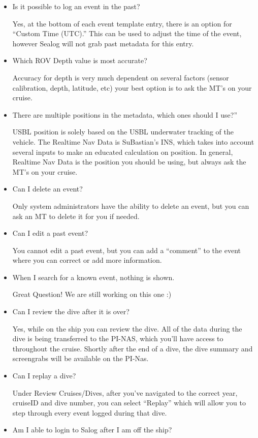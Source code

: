 \documentclass[
  letterpaper,
  DIV=11,
  numbers=noendperiod]{scrreprt}
\begin{document}
\begin{itemize}
\item
  Is it possible to log an event in the past?

  Yes, at the bottom of each event template entry, there is an option
  for ``Custom Time (UTC).'' This can be used to adjust the time of the
  event, however Sealog will not grab past metadata for this entry.
\item
  Which ROV Depth value is most accurate?

  Accuracy for depth is very much dependent on several factors (sensor
  calibration, depth, latitude, etc) your best option is to ask the MT's
  on your cruise.
\item
  There are multiple positions in the metadata, which ones should I
  use?''

  USBL position is solely based on the USBL underwater tracking of the
  vehicle. The Realtime Nav Data is SuBastian's INS, which takes into
  account several inputs to make an educated calculation on position. In
  general, Realtime Nav Data is the position you should be using, but
  always ask the MT's on your cruise.
\item
  Can I delete an event?

  Only system administrators have the ability to delete an event, but
  you can ask an MT to delete it for you if needed.
\item
  Can I edit a past event?

  You cannot edit a past event, but you can add a ``comment'' to the
  event where you can correct or add more information.
\item
  When I search for a known event, nothing is shown.

  Great Question! We are still working on this one :)
\item
  Can I review the dive after it is over?

  Yes, while on the ship you can review the dive. All of the data during
  the dive is being transferred to the PI-NAS, which you'll have access
  to throughout the cruise. Shortly after the end of a dive, the dive
  summary and screengrabs will be available on the PI-Nas.
\item
  Can I replay a dive?

  Under Review Cruises/Dives, after you've navigated to the correct
  year, cruiseID and dive number, you can select ``Replay'' which will
  allow you to step through every event logged during that dive.
\item
  Am I able to login to Salog after I am off the ship?


\end{itemize}
\end{document}
